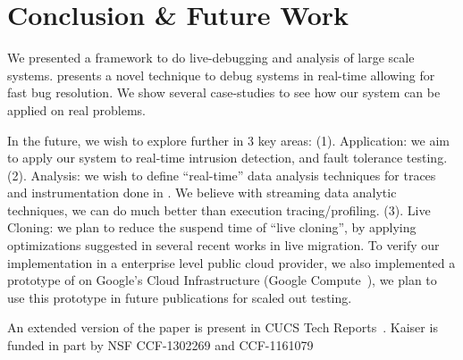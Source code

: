 \section{Conclusion \& Future Work}
\label{sec:conclusion}


We presented \parikshan a framework to do live-debugging and analysis of large scale systems.
\parikshan presents a novel technique to debug systems in real-time allowing for fast bug resolution.
We show several case-studies to see how our system can be applied on real problems. 


In the future, we wish to explore \parikshan further in 3 key areas: (1). Application: we aim to apply our system to real-time intrusion detection, and fault tolerance testing.
(2). Analysis: we wish to define ``real-time'' data analysis techniques for traces and instrumentation done in \parikshan.
We believe with streaming data analytic techniques, we can do much better than execution tracing/profiling.
(3). Live Cloning: we plan to reduce the suspend time of ``live cloning'', by applying optimizations suggested in several recent works in live migration.
To verify our implementation in a enterprise level public cloud provider, we also implemented a prototype of \parikshan on Google's Cloud Infrastructure (Google Compute~\cite{gcompute}), we plan to use this prototype in future publications for scaled out testing. 


An extended version of the paper is present in CUCS Tech Reports~\cite{parikshanTR}. 
Kaiser is funded in part by NSF CCF-1302269 and CCF-1161079
